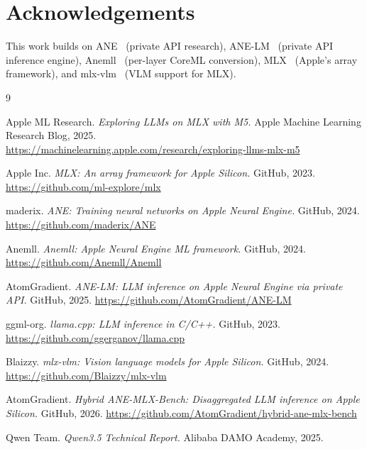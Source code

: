 \documentclass[11pt]{article}
\begin{document}
\section*{Acknowledgements}

This work builds on
ANE~\cite{ane} (private API research),
ANE-LM~\cite{anelm} (private API inference engine),
Anemll~\cite{anemll} (per-layer CoreML conversion),
MLX~\cite{mlx} (Apple's array framework), and
mlx-vlm~\cite{mlxvlm} (VLM support for MLX).

\begin{thebibliography}{9}

Apple ML Research.
\textit{Exploring LLMs on MLX with M5.}
Apple Machine Learning Research Blog, 2025.\\
\url{https://machinelearning.apple.com/research/exploring-llms-mlx-m5}

Apple Inc.
\textit{MLX: An array framework for Apple Silicon.}
GitHub, 2023.
\url{https://github.com/ml-explore/mlx}

maderix.
\textit{ANE: Training neural networks on Apple Neural Engine.}
GitHub, 2024.
\url{https://github.com/maderix/ANE}

Anemll.
\textit{Anemll: Apple Neural Engine ML framework.}
GitHub, 2024.
\url{https://github.com/Anemll/Anemll}

AtomGradient.
\textit{ANE-LM: LLM inference on Apple Neural Engine via private API.}
GitHub, 2025.
\url{https://github.com/AtomGradient/ANE-LM}

ggml-org.
\textit{llama.cpp: LLM inference in C/C++.}
GitHub, 2023.
\url{https://github.com/ggerganov/llama.cpp}

Blaizzy.
\textit{mlx-vlm: Vision language models for Apple Silicon.}
GitHub, 2024.
\url{https://github.com/Blaizzy/mlx-vlm}

AtomGradient.
\textit{Hybrid ANE-MLX-Bench: Disaggregated LLM inference on Apple Silicon.}
GitHub, 2026.
\url{https://github.com/AtomGradient/hybrid-ane-mlx-bench}

Qwen Team.
\textit{Qwen3.5 Technical Report.}
Alibaba DAMO Academy, 2025.

\end{thebibliography}
\end{document}
